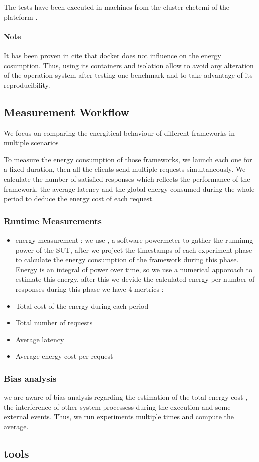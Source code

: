 The tests have been executed in machines from the cluster chetemi of the  plateform .

\paragraph{Note}
It has been proven in {cite } that docker does not influence on the energy cosumption. Thus, using its containers and isolation allow to avoid any alteration of the operation system after testing one benchmark and to take advantage of its reproducibility.

\subsection{Measurement Workflow}
We focus on comparing the energitical behaviour of different frameworks in multiple scenarios

To measure the energy consumption of those frameworks, we launch each one for a fixed duration, then all the clients send multiple requests simultaneously.
We calculate %
the number of satisfied responses which reflects the performance of the framework, the average latency and the global energy consumed during the whole period to deduce the energy cost of each request.


\subsubsection{Runtime Measurements}
\begin{itemize}
    \item energy measurement :
          we use , a software powermeter  to gather the runninng power of the SUT, after we project the timestamps of each experiment phase to calculate the energy consumption of the framework during this phase.
          Energy is an integral of power over time, so we use a numerical apporoach to estimate this energy. 
          after this we devide the calculated energy per number of responses
          during this phase
          we have 4 mertrics :

    \item Total cost of the energy during each period
    \item Total number of requests
    \item Average latency
    \item Average energy cost per request
\end{itemize}


\subsubsection{Bias analysis}
we are aware of bias analysis regarding the estimation of the total energy cost , the interference of other system processess during the execution and some external events. Thus, we run experiments multiple times and compute the average.

\subsection{tools }
